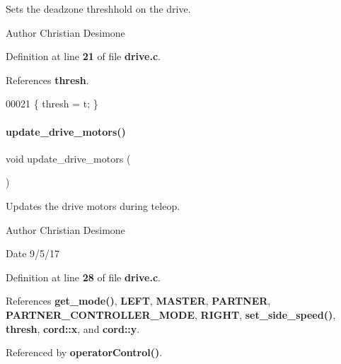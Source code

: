 Sets the deadzone threshhold on the drive. 

\begin{DoxyAuthor}{Author}
Christian Desimone 
\end{DoxyAuthor}


Definition at line \textbf{ 21} of file \textbf{ drive.\+c}.



References \textbf{ thresh}.


\begin{DoxyCode}
00021 \{ thresh = t; \}
\end{DoxyCode}
\mbox{\label{a00092_a8224a4626a934d30ed587671b7004bf8}} 
\paragraph{update\+\_\+drive\+\_\+motors()}
{\footnotesize\ttfamily void update\+\_\+drive\+\_\+motors (\begin{DoxyParamCaption}{ }\end{DoxyParamCaption})}



Updates the drive motors during teleop. 

\begin{DoxyAuthor}{Author}
Christian Desimone 
\end{DoxyAuthor}
\begin{DoxyDate}{Date}
9/5/17 
\end{DoxyDate}


Definition at line \textbf{ 28} of file \textbf{ drive.\+c}.



References \textbf{ get\+\_\+mode()}, \textbf{ L\+E\+FT}, \textbf{ M\+A\+S\+T\+ER}, \textbf{ P\+A\+R\+T\+N\+ER}, \textbf{ P\+A\+R\+T\+N\+E\+R\+\_\+\+C\+O\+N\+T\+R\+O\+L\+L\+E\+R\+\_\+\+M\+O\+DE}, \textbf{ R\+I\+G\+HT}, \textbf{ set\+\_\+side\+\_\+speed()}, \textbf{ thresh}, \textbf{ cord\+::x}, and \textbf{ cord\+::y}.



Referenced by \textbf{ operator\+Control()}.


